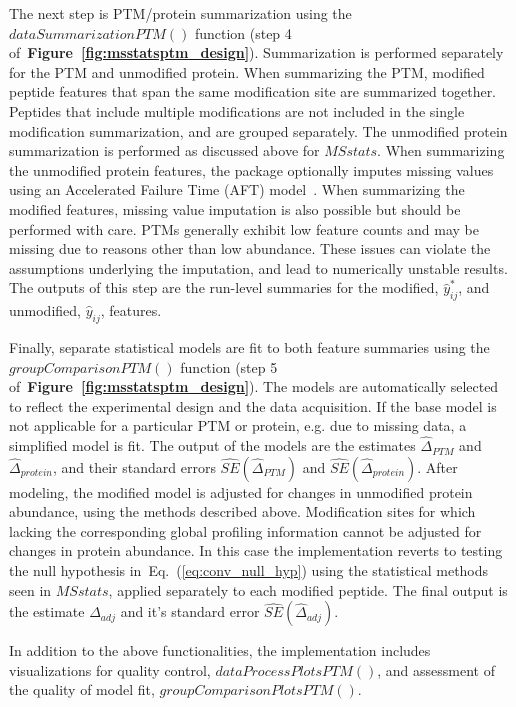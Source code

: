 \documentclass[mcp]{article}
\numberwithin{table}{section}
\def\eqref#1{Eq.~(\ref{eq:#1})}
\def\figref#1{{\bf Figure~\ref{fig:#1}}}
\begin{document}
The next step is PTM/protein summarization using the $dataSummarizationPTM()$ function (step 4 of~\figref{msstatsptm_design}). Summarization is performed separately for the PTM and unmodified protein. When summarizing the PTM, modified peptide features that span the same modification site are summarized together. Peptides that include multiple modifications are not included in the single modification summarization, and are grouped separately. The unmodified protein summarization is performed as discussed above for $MSstats$. When summarizing the unmodified protein features, the package optionally imputes missing values using an Accelerated Failure Time (AFT) model~\cite{Wei:1992}. When summarizing the modified features, missing value imputation is also possible but should be performed with care. PTMs generally exhibit low feature counts and may be missing due to reasons other than low abundance. These issues can violate the assumptions underlying the imputation, and lead to numerically unstable results. The outputs of this step are the run-level summaries for the modified, $\hat{y}_{ij}^{\ast}$, and unmodified, $\hat{y}_{ij}$, features.

Finally, separate statistical models are fit to both feature summaries using the $groupComparisonPTM()$ function (step 5 of~\figref{msstatsptm_design}). The models are automatically selected to reflect the experimental design and the data acquisition. If the base model is not applicable for a particular PTM or protein, e.g. due to missing data, a simplified model is fit. The output of the models are the estimates $\hat{\Delta}_{PTM}$ and $\hat{\Delta}_{protein}$, and their standard errors $\widehat{SE}(\hat{\Delta}_{PTM})$ and $\widehat{SE}(\hat{\Delta}_{protein})$. After modeling, the modified model is adjusted for changes in unmodified protein abundance, using the methods described above. Modification sites for which lacking the corresponding global profiling information cannot be adjusted for changes in protein abundance. In this case the implementation reverts to testing the null hypothesis in~\eqref{conv_null_hyp} using the statistical methods seen in $MSstats$, applied separately to each modified peptide. The final output is the estimate $\hat{\Delta}_{adj}$ and it's standard error $\widehat{SE}(\hat{\Delta}_{adj})$.

In addition to the above functionalities, the implementation includes visualizations for quality control, $dataProcessPlotsPTM()$, and assessment of the quality of model fit, $groupComparisonPlotsPTM()$.
\end{document}
